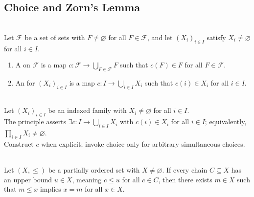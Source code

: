 \subsection{Choice and Zorn's Lemma}

\begin{definition} \label{def:choice-function} \\
Let $\mathcal{F}$ be a set of sets with $F\neq\varnothing$ for all $F\in\mathcal{F}$, and let $(X_i)_{i\in I}$ satisfy $X_i\neq\varnothing$ for all $i\in I$.
\begin{enumerate}[label=(\roman*)]
\setlength{\itemsep}{0pt}
\item A  on $\mathcal{F}$ is a map $c:\mathcal{F}\to\bigcup_{F\in\mathcal{F}}F$ such that $c(F)\in F$ for all $F\in\mathcal{F}$.
\item An  for $(X_i)_{i\in I}$ is a map $c:I\to\bigcup_{i\in I}X_i$ such that $c(i)\in X_i$ for all $i\in I$.
\end{enumerate}
\end{definition}

\begin{principle} \label{princ:axiom-of-choice-analysis} \\
Let $(X_i)_{i\in I}$ be an indexed family with $X_i\neq\varnothing$ for all $i\in I$.\\
The principle asserts $\exists c:I\to\bigcup_{i\in I}X_i$ with $c(i)\in X_i$ for all $i\in I$; equivalently, $\prod_{i\in I}X_i\neq\varnothing$.\\
Construct $c$ when explicit; invoke choice only for arbitrary simultaneous choices.
\end{principle}

\begin{principle} \label{princ:zorns-lemma} \\
Let $(X,\leq)$ be a partially ordered set with $X\neq\varnothing$. If every chain $C\subseteq X$ has an upper bound $u\in X$, meaning $c\leq u$ for all $c\in C$, then there exists $m\in X$ such that $m\leq x$ implies $x=m$ for all $x\in X$.
\end{principle}

